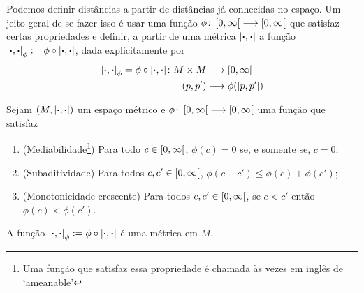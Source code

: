 Podemos definir distâncias a partir de distâncias já conhecidas no espaço. Um jeito geral de se fazer isso é usar uma função $\phi\colon \allowbreak \left[0,\allowbreak \infty\right[ \longrightarrow \left[0,\allowbreak \infty\right[$ que satisfaz certas propriedades e definir, a partir de uma métrica $\left\vert{\bm{\cdot}},{\bm{\cdot}}\right\vert$ a função $\left\vert{\bm{\cdot}},{\bm{\cdot}}\right\vert_\phi := \phi \circ \left\vert{\bm{\cdot}},{\bm{\cdot}}\right\vert$, dada explicitamente por
	\begin{align*}
	{\left\vert{\bm{\cdot}},{\bm{\cdot}}\right\vert_\phi = \phi \circ \left\vert{\bm{\cdot}},{\bm{\cdot}}\right\vert}\colon {M \times M} &\longrightarrow {\left[0,\allowbreak \infty\right[} \\{(p,p')} &\longmapsto \phi(\left\vert{p},{p'}\right\vert)
	\end{align*}

\begin{proposition}
\label{prop:funcao.subaditiva.crescente.preserva.metrica}
Sejam $(M, \left\vert{\bm{\cdot}},{\bm{\cdot}}\right\vert)$ um espaço métrico e $\phi\colon \allowbreak \left[0,\allowbreak \infty\right[ \longrightarrow \left[0,\allowbreak \infty\right[$ uma função que satisfaz
	\begin{enumerate}
	\item (Mediabilidade\footnote{Uma função que satisfaz essa propriedade é chamada às vezes em inglês de `ameanable'}) Para todo $c \in \left[0,\allowbreak \infty\right[$, $\phi(c) = 0$ se, e somente se, $c=0$;
	\item (Subaditividade) Para todos $c,c' \in \left[0,\allowbreak \infty\right[$, $\phi(c+c') \leq \phi(c) + \phi(c')$;
	\item (Monotonicidade crescente) Para todos $c,c' \in \left[0,\allowbreak \infty\right[$, se $c < c'$ então $\phi(c) < \phi(c')$.
	\end{enumerate}
A função $\left\vert{\bm{\cdot}},{\bm{\cdot}}\right\vert_\phi := \phi \circ \left\vert{\bm{\cdot}},{\bm{\cdot}}\right\vert$
é uma métrica em $M$.
\end{proposition}
